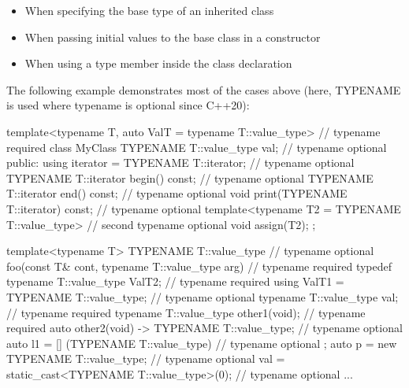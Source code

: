 \begin{itemize}
\item 
When specifying the base type of an inherited class

\item 
When passing initial values to the base class in a constructor

\item 
When using a type member inside the class declaration
\end{itemize}

The following example demonstrates most of the cases above (here, TYPENAME is used where typename is optional since C++20):

\begin{cpp}
template<typename T,
auto ValT = typename T::value_type{}> // typename required
class MyClass {
	TYPENAME T::value_type val; // typename optional
	public:
	using iterator = TYPENAME T::iterator; // typename optional
	TYPENAME T::iterator begin() const; // typename optional
	TYPENAME T::iterator end() const; // typename optional
	void print(TYPENAME T::iterator) const; // typename optional
	template<typename T2 = TYPENAME T::value_type> // second typename optional
	void assign(T2);
};

template<typename T>
TYPENAME T::value_type // typename optional
foo(const T& cont, typename T::value_type arg) // typename required
{
	typedef typename T::value_type ValT2; // typename required
	using ValT1 = TYPENAME T::value_type; // typename optional
	typename T::value_type val; // typename required
	typename T::value_type other1(void); // typename required
	auto other2(void) -> TYPENAME T::value_type; // typename optional
	auto l1 = [] (TYPENAME T::value_type) { // typename optional
	};
	auto p = new TYPENAME T::value_type; // typename optional
	val = static_cast<TYPENAME T::value_type>(0); // typename optional
	...
}
\end{cpp}










